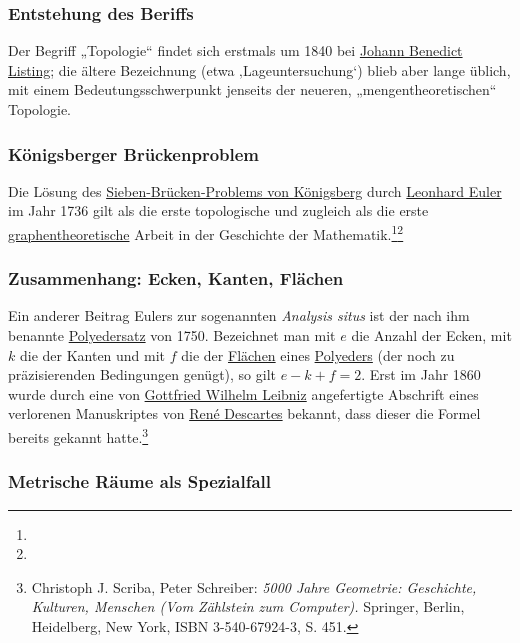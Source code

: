 \documentclass[12pt,]{article}
\begin{document}
\subsubsection{Entstehung des Beriffs}\label{entstehung-des-beriffs}

Der Begriff „Topologie`` findet sich erstmals um 1840 bei
\href{Johann_Benedict_Listing}{Johann Benedict Listing}; die ältere
Bezeichnung \emph{} (etwa ‚Lageuntersuchung`) blieb aber lange üblich,
mit einem Bedeutungsschwerpunkt jenseits der neueren,
„mengentheoretischen`` Topologie.

\subsubsection{Königsberger
Brückenproblem}\label{kuxf6nigsberger-bruxfcckenproblem}

Die Lösung des
\href{Königsberger_Brückenproblem}{Sieben-Brücken-Problems von
Königsberg} durch \href{Leonhard_Euler}{Leonhard Euler} im Jahr 1736
gilt als die erste topologische und zugleich als die erste
\href{Graphentheorie}{graphentheoretische} Arbeit in der Geschichte der
Mathematik.\footnote{}\footnote{}

\subsubsection{Zusammenhang: Ecken, Kanten,
Flächen}\label{zusammenhang-ecken-kanten-fluxe4chen}

Ein anderer Beitrag Eulers zur sogenannten \emph{Analysis situs} ist der
nach ihm benannte \url{Polyedersatz} von 1750. Bezeichnet man mit \(e\)
die Anzahl der Ecken, mit \(k\) die der Kanten und mit \(f\) die der
\href{Fläche_(Mathematik)}{Flächen} eines \href{Polyeder}{Polyeders}
(der noch zu präzisierenden Bedingungen genügt), so gilt
\(e - k + f = 2\). Erst im Jahr 1860 wurde durch eine von
\href{Gottfried_Wilhelm_Leibniz}{Gottfried Wilhelm Leibniz} angefertigte
Abschrift eines verlorenen Manuskriptes von \href{René_Descartes}{René
Descartes} bekannt, dass dieser die Formel bereits gekannt
hatte.\footnote{Christoph J. Scriba, Peter Schreiber: \emph{5000 Jahre
  Geometrie: Geschichte, Kulturen, Menschen (Vom Zählstein zum
  Computer).} Springer, Berlin, Heidelberg, New York, ISBN
  3-540-67924-3, S. 451.}

\subsubsection{Metrische Räume als
Spezialfall}\label{metrische-ruxe4ume-als-spezialfall}
\end{document}
